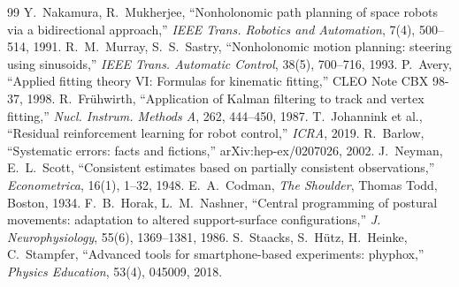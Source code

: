 \documentclass[paper=a4paper,fontsize=10pt,twocolumn,column_gap=2zw,line_length=24zw,number_of_lines=46,head_space=20mm]{jlreq}
\begin{document}
\begin{thebibliography}{99}
 Y.~Nakamura, R.~Mukherjee, ``Nonholonomic path planning of space robots via a bidirectional approach,'' \textit{IEEE Trans. Robotics and Automation}, 7(4), 500--514, 1991.
 R.~M.~Murray, S.~S.~Sastry, ``Nonholonomic motion planning: steering using sinusoids,'' \textit{IEEE Trans. Automatic Control}, 38(5), 700--716, 1993.
 P.~Avery, ``Applied fitting theory VI: Formulas for kinematic fitting,'' CLEO Note CBX 98-37, 1998.
 R.~Frühwirth, ``Application of Kalman filtering to track and vertex fitting,'' \textit{Nucl. Instrum. Methods A}, 262, 444--450, 1987.
 T.~Johannink et al., ``Residual reinforcement learning for robot control,'' \textit{ICRA}, 2019.
 R.~Barlow, ``Systematic errors: facts and fictions,'' arXiv:hep-ex/0207026, 2002.
 J.~Neyman, E.~L.~Scott, ``Consistent estimates based on partially consistent observations,'' \textit{Econometrica}, 16(1), 1--32, 1948.
 E.~A.~Codman, \textit{The Shoulder}, Thomas Todd, Boston, 1934.
 F.~B.~Horak, L.~M.~Nashner, ``Central programming of postural movements: adaptation to altered support-surface configurations,'' \textit{J. Neurophysiology}, 55(6), 1369--1381, 1986.
 S.~Staacks, S.~Hütz, H.~Heinke, C.~Stampfer, ``Advanced tools for smartphone-based experiments: phyphox,'' \textit{Physics Education}, 53(4), 045009, 2018.
\end{thebibliography}
\end{document}
